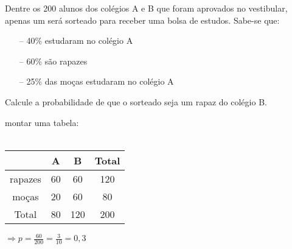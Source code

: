 \begin{ex}
Dentre os 200 alunos dos colégios A e B que foram aprovados no vestibular, apenas um será sorteado para receber uma bolsa de estudos. Sabe-se que:
   \begin{itemize}
   \item [--] 40\% estudaram no colégio A
   \item [--] 60\% são rapazes
   \item [--] 25\% das moças estudaram no colégio A
   \end{itemize}
Calcule a probabilidade de que o sorteado seja um rapaz do colégio B.
 \begin{sol}
   \phantom{A} 
   montar uma tabela: \\   \\
   \begin{tabular}{|c|c|c|c|}   \hline
          & A & B & Total  \\  \hline
    rapazes&60 & 60 & 120  \\  \hline
    moças & 20 & 60 & 80   \\  \hline
    Total & 80 & 120 & 200  \\   \hline
     \end{tabular}
     $ \Longrightarrow  p = \frac{60}{200}=\frac{3}{10}=0,3$  
 \end{sol}
\end{ex}